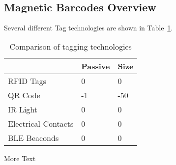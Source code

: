 \subsection{Magnetic Barcodes Overview}
\label{sec:FlywheelAndBraking}

Several different Tag technologies are shown in Table~\ref{tab:info}.

\begin{table}[h]
  \caption{Comparison of tagging technologies}
      
  \begin{tabular}{ p{3.4cm}  p{1.9cm}  p{1.9cm} }
    \hline
    & Passive & Size \\
    \hline
    RFID Tags & 0 & 0  \\
    QR Code &  -1 & -50 \\
    IR Light & 0 & 0 \\
    Electrical Contacts & 0 & 0 \\
    BLE Beaconds & 0 & 0 \\

    \end{tabular}
  
  \label{tab:info}    
\end{table}

More Text




